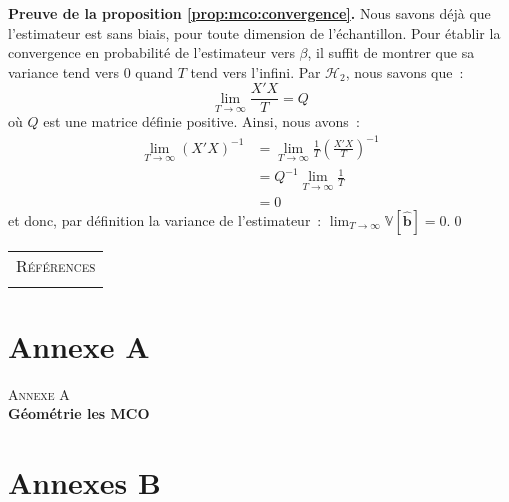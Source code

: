\documentclass[10pt]{beamer}
\theoremstyle{plain}
\begin{document}
\begin{notes}

  \textbf{Preuve de la proposition \ref{prop:mco:convergence}.} Nous savons déjà que l'estimateur est sans biais, pour toute dimension de l'échantillon. Pour établir la convergence en probabilité de l'estimateur vers $\beta$, il suffit de montrer que sa variance tend vers 0 quand $T$ tend vers l'infini. Par $\mathcal H_2$, nous savons que~:
\[
      \lim_{T\rightarrow\infty} \frac{X'X}{T} = Q
    \]
    où $Q$ est une matrice définie positive. Ainsi, nous avons~:
    \[
      \begin{split}
        \lim_{T\to\infty} (X'X)^{-1} &= \lim_{T\to\infty} \frac{1}{T}\left(\frac{X'X}{T}\right)^{-1}\\
                                     &= Q^{-1}\lim_{T\to\infty} \frac{1}{T}\\
                                     &= 0
      \end{split}
    \]
    et donc, par définition la variance de l'estimateur~: $\lim_{T\to\infty} \mathbb V[\hat{\mathbf b}] = 0$.\qed
\end{notes}


\begin{notes}

  \begin{center}
    \begin{tabular}{c}
      \\
      \Huge{\textsc{Références}}\\
      \\
    \end{tabular}
  \end{center}

  \bigskip

  \printbibliography

\end{notes}



\section{Annexe A}

\begin{frame}
  \begin{center}
    \Huge{\textsc{Annexe A}}\\
    \Huge\textbf{Géométrie les MCO}
  \end{center}
\end{frame}


\section{Annexes B}
\end{document}
